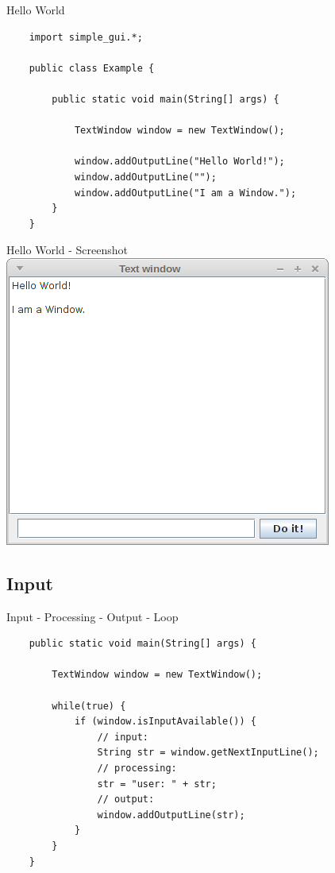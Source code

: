 \begin{frame}[fragile]{Hello World}
	\begin{lstlisting}
	import simple_gui.*;

	public class Example {

	    public static void main(String[] args) {
		
	        TextWindow window = new TextWindow();
	        
	        window.addOutputLine("Hello World!");
	        window.addOutputLine("");
	        window.addOutputLine("I am a Window.");
	    }
	}	
	\end{lstlisting}
\end{frame}

\begin{frame}{Hello World - Screenshot}
	\includegraphics[scale=0.4]{res/gui_textlines.png}
\end{frame}

\subsection{Input}
\begin{frame}[fragile]{Input - Processing - Output - Loop}
	\begin{lstlisting}
	public static void main(String[] args) {
		
	    TextWindow window = new TextWindow();
	    
	    while(true) {
	        if (window.isInputAvailable()) {
	            // input:
	            String str = window.getNextInputLine();
	            // processing:
	            str = "user: " + str;
	            // output:
	            window.addOutputLine(str);
	        }	    
	    }
	}	
	\end{lstlisting}
\end{frame}

